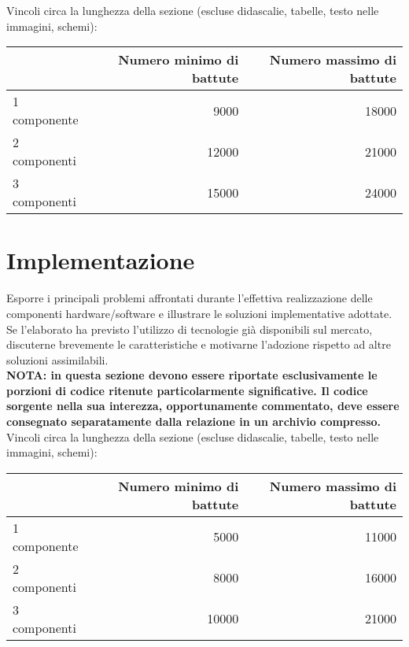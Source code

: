 \documentclass[12pt]{article}
\begin{document}
Vincoli circa la lunghezza della sezione (escluse didascalie, tabelle, testo nelle immagini, schemi):

\vspace{1cm}
\begin{tabular}{l|rr}
 & Numero minimo di battute & Numero massimo di battute \\
 \hline
 1 componente & 9000 & 18000 \\
 2 componenti & 12000 & 21000 \\
 3 componenti & 15000 & 24000 \\
 \hline
\end{tabular}


\newpage



\section{Implementazione}\label{sec:implementazione}

Esporre i principali problemi affrontati durante l'effettiva realizzazione delle componenti hardware/software e illustrare le soluzioni implementative adottate. Se l'elaborato ha previsto l'utilizzo di tecnologie già disponibili sul mercato, discuterne brevemente le caratteristiche e motivarne l'adozione rispetto ad altre soluzioni assimilabili.\\

\textbf{NOTA: in questa sezione devono essere riportate esclusivamente le porzioni di codice ritenute particolarmente significative. Il codice sorgente nella sua interezza, opportunamente commentato, deve essere consegnato separatamente dalla relazione in un archivio compresso.}\\


Vincoli circa la lunghezza della sezione (escluse didascalie, tabelle, testo nelle immagini, schemi):

\vspace{1cm}
\begin{tabular}{l|rr}
 & Numero minimo di battute & Numero massimo di battute \\
 \hline
 1 componente & 5000 & 11000 \\
 2 componenti & 8000 & 16000 \\
 3 componenti & 10000 & 21000 \\
 \hline
\end{tabular}
\end{document}
